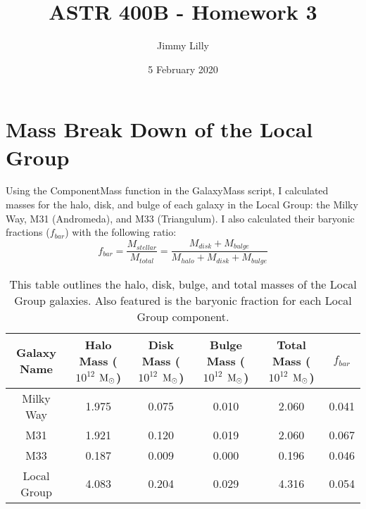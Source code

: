 \documentclass{aastex62}
\begin{document}
\title{\Large{ASTR 400B - Homework 3}}
\author{Jimmy Lilly}
\address{Steward Observatory,  University  of  Arizona}
\date{5 February 2020}

\section{Mass Break Down of the Local Group}
Using the ComponentMass function in the GalaxyMass script, I calculated masses for the halo, disk, and bulge of each galaxy in the Local Group: the Milky Way, M31 (Andromeda), and M33 (Triangulum). I also calculated their baryonic fractions ($f_{bar}$) with the following ratio:
\begin{equation}
    f_{bar} = \frac{M_{stellar}}{M_{total}} = \frac{M_{disk}+M_{bulge}}{M_{halo}+M_{disk}+M_{bulge}}
\end{equation}
\begin{table}[ht]
    \centering
    \begin{tabular}{|c|c|c|c|c|c|}
    \hline
        Galaxy Name & Halo Mass ($10^{12}$ \(\textup{M}_\odot\)) & Disk Mass ($10^{12}$ \(\textup{M}_\odot\)) & Bulge Mass ($10^{12}$ \(\textup{M}_\odot\)) & Total Mass ($10^{12}$ \(\textup{M}_\odot\)) & $f_{bar}$ \\
    \hline
    \hline
    Milky Way & 1.975 & 0.075 & 0.010 & 2.060 & 0.041 \\
    \hline
    M31 & 1.921 & 0.120 & 0.019 & 2.060 & 0.067 \\
    \hline
    M33 & 0.187 & 0.009 & 0.000 & 0.196 & 0.046 \\
    \hline
    Local Group & 4.083 & 0.204 & 0.029 & 4.316 & 0.054 \\
    \hline
    \end{tabular}
    \caption{This table outlines the halo, disk, bulge, and total masses of the Local Group galaxies. Also featured is the baryonic fraction for each Local Group component.}
\end{table}
\end{document}
